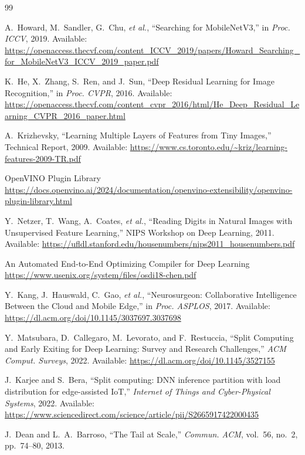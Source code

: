 \documentclass{article}
\begin{document}
\begin{thebibliography}{99}

A.~Howard, M.~Sandler, G.~Chu, \emph{et al.}, “Searching for MobileNetV3,” in \emph{Proc. ICCV}, 2019. Available: \url{https://openaccess.thecvf.com/content_ICCV_2019/papers/Howard_Searching_for_MobileNetV3_ICCV_2019_paper.pdf}

K.~He, X.~Zhang, S.~Ren, and J.~Sun, “Deep Residual Learning for Image Recognition,” in \emph{Proc. CVPR}, 2016. Available: \url{https://openaccess.thecvf.com/content_cvpr_2016/html/He_Deep_Residual_Learning_CVPR_2016_paper.html}

A.~Krizhevsky, “Learning Multiple Layers of Features from Tiny Images,” Technical Report, 2009. Available: \url{https://www.cs.toronto.edu/~kriz/learning-features-2009-TR.pdf}

OpenVINO Plugin Library
\url{https://docs.openvino.ai/2024/documentation/openvino-extensibility/openvino-plugin-library.html}

Y.~Netzer, T.~Wang, A.~Coates, \emph{et al.}, “Reading Digits in Natural Images with Unsupervised Feature Learning,” NIPS Workshop on Deep Learning, 2011. Available: \url{https://ufldl.stanford.edu/housenumbers/nips2011_housenumbers.pdf}

An Automated End-to-End Optimizing Compiler for Deep Learning
\url{https://www.usenix.org/system/files/osdi18-chen.pdf}

Y.~Kang, J.~Hauswald, C.~Gao, \emph{et al.}, “Neurosurgeon: Collaborative Intelligence Between the Cloud and Mobile Edge,” in \emph{Proc. ASPLOS}, 2017. Available: \url{https://dl.acm.org/doi/10.1145/3037697.3037698}

Y.~Matsubara, D.~Callegaro, M.~Levorato, and F.~Restuccia, “Split Computing and Early Exiting for Deep Learning: Survey and Research Challenges,” \emph{ACM Comput. Surveys}, 2022. Available: \url{https://dl.acm.org/doi/10.1145/3527155}

J.~Karjee and S.~Bera, “Split computing: DNN inference partition with load distribution for edge-assisted IoT,” \emph{Internet of Things and Cyber-Physical Systems}, 2022. Available: \url{https://www.sciencedirect.com/science/article/pii/S2665917422000435}

J.~Dean and L.~A.~Barroso, “The Tail at Scale,” \emph{Commun. ACM}, vol.~56, no.~2, pp.~74–80, 2013.


\end{thebibliography}
\end{document}
